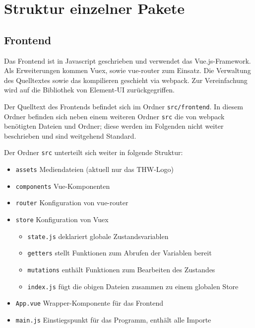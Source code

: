\section{Struktur einzelner Pakete}
\label{sec:struktur_einzelner_pakete}

  \subsection*{Frontend}
  \label{sub:frontend}

    Das Frontend ist in \gls{Javascript} geschrieben und verwendet das \gls{Vue.js}-Framework. Als
    Erweiterungen kommen \gls{Vuex}, sowie \gls{vue-router} zum Einsatz. Die Verwaltung des Quelltextes
    sowie das kompilieren geschieht via \gls{webpack}. Zur Vereinfachung wird auf die
    Bibliothek von \gls{Element-UI} zurückgegriffen.
  
    Der Quelltext des Frontends befindet sich im Ordner \verb+src/frontend+. In diesem Ordner
    befinden sich neben einem weiteren Ordner \verb+src+ die von \gls{webpack} benötigten Dateien
    und Ordner; diese werden im Folgenden nicht weiter beschrieben und sind weitgehend Standard.

    Der Ordner \verb+src+ unterteilt sich weiter in folgende Struktur:


    \begin{itemize}
      \item \verb+assets+ Mediendateien (aktuell nur das THW-Logo)
      \item \verb+components+ Vue-Komponenten
      \item \verb+router+ Konfiguration von vue-router
      \item \verb+store+ Konfiguration von Vuex
        \begin{itemize}
          \item \verb+state.js+ deklariert globale Zustandsvariablen
          \item \verb+getters+ stellt Funktionen zum Abrufen der Variablen bereit
          \item \verb+mutations+ enthält Funktionen zum Bearbeiten des Zustandes
          \item \verb+index.js+ fügt die obigen Dateien zusammen zu einem globalen Store
        \end{itemize}
      \item \verb+App.vue+ Wrapper-Komponente für das Frontend
      \item \verb+main.js+ Einstiegspunkt für das Programm, enthält alle Importe
    \end{itemize}
    
